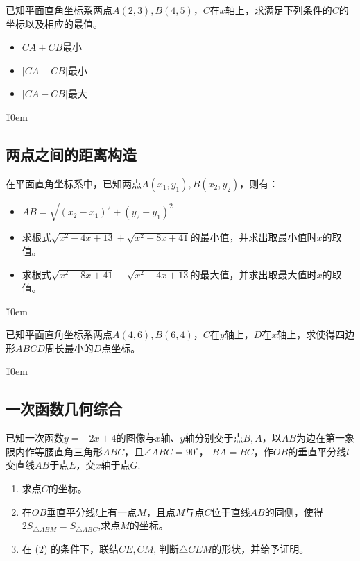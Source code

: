 \begin{example}
    已知平面直角坐标系两点$A(2,3),B(4,5)$，$C$在$x$轴上，求满足下列条件的$C$的坐标以及相应的最值。
    \begin{itemize}
        \item $CA+CB$最小
        \item $|CA-CB|$最小
        \item $|CA-CB|$最大
    \end{itemize}
\end{example}

\v{10em}

\subsection{两点之间的距离构造}

\begin{theorem}[两点间的距离公式]
    在平面直角坐标系中，已知两点$A(x_1,y_1),B(x_2,y_2)$，则有：
    \begin{itemize}
        \item $AB=\sqrt{(x_2-x_1)^2+(y_2-y_1)^2}$
    \end{itemize}
\end{theorem}

\begin{example}
    \begin{itemize}
        \item 求根式$\sqrt{x^2-4x+13}+\sqrt{x^2-8x+41}$的最小值，并求出取最小值时$x$的取值。
        \item 求根式$\sqrt{x^2-8x+41}-\sqrt{x^2-4x+13}$的最大值，并求出取最大值时$x$的取值。
    \end{itemize}
\end{example}

\v{10em}

\begin{example}
    已知平面直角坐标系两点$A(4,6),B(6,4)$，$C$在$y$轴上，$D$在$x$轴上，求使得四边形$ABCD$周长最小的$D$点坐标。
\end{example}

\v{10em}

\subsection{一次函数几何综合}

\begin{example}
    已知一次函数$y=-2x+4$的图像与$x$轴、$y$轴分别交于点$B,A$，以$AB$为边在第一象限内作等腰直角三角形$ABC$，且$\angle ABC=90^\circ$，
    $BA=BC$，作$OB$的垂直平分线$l$交直线$AB$于点$E$，交$x$轴于点$G$.
    \begin{enumerate}
        \item 求点$C$的坐标。
        \item 在$OB$垂直平分线$l$上有一点$M$，且点$M$与点$C$位于直线$AB$的同侧，使得$2S_{\triangle ABM}=S_{\triangle ABC}$,求点$M$的坐标。
        \item 在 (2) 的条件下，联结$CE,CM$, 判断$\triangle CEM$的形状，并给予证明。
    \end{enumerate}
\end{example}

